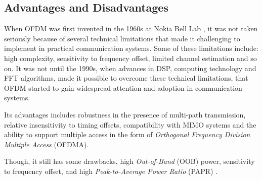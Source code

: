 \documentclass[11pt]{article}
\numberwithin{figure}{section}
\numberwithin{equation}{section}
\begin{document}
\subsection{Advantages and Disadvantages}
When OFDM was first invented in the 1960s at Nokia Bell Lab \cite{RN82}, it was not taken seriously because of several technical limitations that made it challenging to implement in practical communication systems. Some of these limitations include: high complexity, sensitivity to frequency offset, limited channel estimation and so on. It was not until the 1990s, when advances in DSP, computing technology and FFT algorithms, made it possible to overcome these technical limitations, that OFDM started to gain widespread attention and adoption in communication systems. 

Its advantages includes robustness in the presence of multi-path transmission, relative insensitivity to timing offsets, compatibility with MIMO systems and the ability to support multiple access in the form of \textit{Orthogonal Frequency Division Multiple Access} (OFDMA). 

Though, it still has some drawbacks, high \textit{Out-of-Band} (OOB) power, sensitivity to frequency offset, and high \textit{Peak-to-Average Power Ratio} (PAPR) \cite{RN81}.
\end{document}
